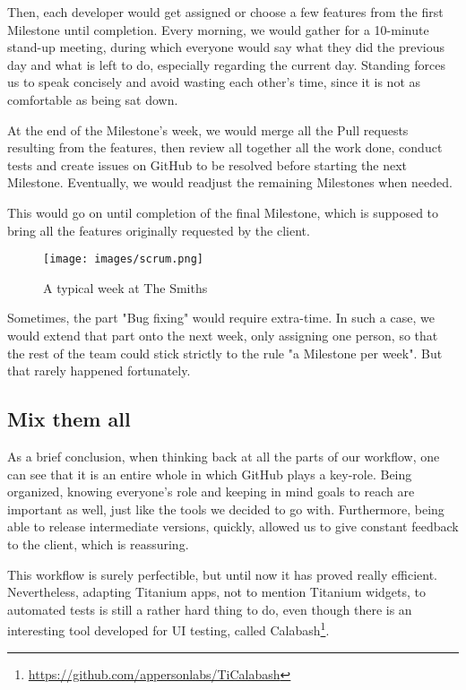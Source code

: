 Then, each developer would get assigned or choose a few features from the first Milestone until completion. Every morning, we would gather for a 10-minute stand-up meeting, during which everyone would say what they did the previous day and what is left to do, especially regarding the current day. Standing forces us to speak concisely and avoid wasting each other's time, since it is not as comfortable as being sat down.

\medskip

At the end of the Milestone's week, we would merge all the Pull requests resulting from the features, then review all together all the work done, conduct tests and create issues on GitHub to be resolved before starting the next Milestone. Eventually, we would readjust the remaining Milestones when needed.

\medskip

This would go on until completion of the final Milestone, which is supposed to bring all the features originally requested by the client.

\begin{figure}[H]
   \centering\texttt{[image: images/scrum.png]}
   \caption[Scrum]{A typical week at The Smiths}
\end{figure}

Sometimes, the part "Bug fixing" would require extra-time. In such a case, we would extend that part onto the next week, only assigning one person, so that the rest of the team could stick strictly to the rule "a Milestone per week". But that rarely happened fortunately.

\subsection{Mix them all}

As a brief conclusion, when thinking back at all the parts of our workflow, one can see that it is an entire whole in which GitHub plays a key-role. Being organized, knowing everyone's role and keeping in mind goals to reach are important as well, just like the tools we decided to go with. Furthermore, being able to release intermediate versions, quickly, allowed us to give constant feedback to the client, which is reassuring.

\medskip

This workflow is surely perfectible, but until now it has proved really efficient. Nevertheless, adapting Titanium apps, not to mention Titanium widgets, to automated tests is still a rather hard thing to do, even though there is an interesting tool developed for UI testing, called Calabash\footnote{\href{https://github.com/appersonlabs/TiCalabash}{https://github.com/appersonlabs/TiCalabash}}.